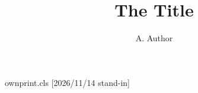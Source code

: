 \begin{filecontents*}[overwrite]{ownprint.cls}
[2026/11/14 stand-in]
\renewcommand\maketitle{{\centering{\Large\@title\par}\@author\par}}
\end{filecontents*}
\documentclass{ownprint}

\title{The Title}
\author{A. Author}
Dated May 14th.
\maketitle
Body.

